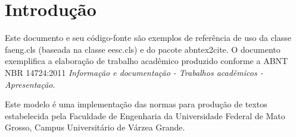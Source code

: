 \chapter[Introdução]{Introdução}

Este documento e seu código-fonte são exemplos de referência de uso da classe \textsf{faeng.cls} (baseada na classe \textsf{eesc.cls}) e do pacote \textsf{abntex2cite}. O documento exemplifica a elaboração de trabalho acadêmico produzido conforme a \ac{ABNT} \ac{NBR} 14724:2011 \emph{Informação e documentação - Trabalhos acadêmicos - Apresentação}.

Este modelo é uma implementação das normas para produção de textos estabelecida pela Faculdade de Engenharia da Universidade Federal de Mato Grosso, Campus Universitário de Várzea Grande.